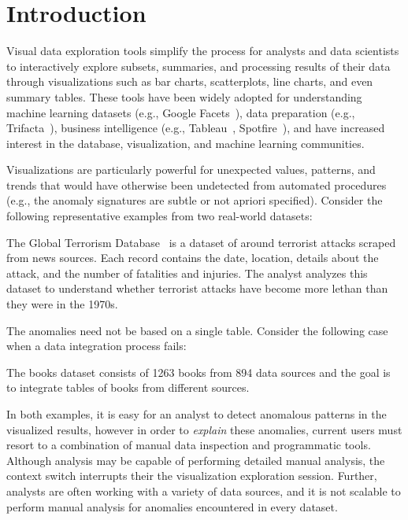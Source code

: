 \section{Introduction}\label{intro}\sloppy
Visual data exploration tools simplify the process for analysts and data scientists to interactively explore subsets, summaries, and processing results of their data through visualizations such as bar charts, scatterplots, line charts, and even summary tables.  These tools have been widely adopted for understanding machine learning datasets (e.g., Google Facets~\cite{googlefacets}), data preparation (e.g., Trifacta~\cite{trifacta}), business intelligence (e.g., Tableau~\cite{stolte2002polaris}, Spotfire~\cite{shneiderman1999dynamic}), and have increased interest in the database, visualization, and machine learning communities. 

Visualizations are particularly powerful for unexpected values, patterns, and trends that would have otherwise been undetected from automated procedures (e.g., the anomaly signatures are subtle or not apriori specified).  Consider the following representative examples from two real-world datasets: 

\begin{example}[Terrorism]
The Global Terrorism Database~\cite{data-terrorism} is a dataset of around terrorist attacks scraped from news sources.  Each record contains the date, location, details about the attack, and the number of fatalities and injuries. 
The analyst analyzes this dataset to understand whether terrorist attacks have become more lethan than they were in the 1970s.  
\label{e:terrorism}
\end{example}

The anomalies need not be based on a single table.  Consider the following case when a data integration process fails:

\begin{example}[Integration]
The books dataset consists of 1263 books from 894 data sources and the goal is to integrate tables of books from different sources.    
\label{e:ml}
\end{example}

In both examples, it is easy for an analyst to detect anomalous patterns in the visualized results, however in order to {\it explain} these anomalies, current users must resort to a combination of manual data inspection and programmatic tools. 
Although analysis may be capable of performing detailed manual analysis, the context switch interrupts their the visualization exploration session.  
Further, analysts are often working with a variety of data sources,  and it is not scalable to perform manual analysis for anomalies encountered in every dataset.

